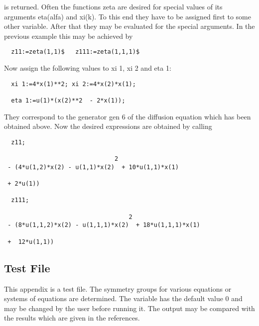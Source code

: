 is returned. Often the functions zeta are desired for special values
of its arguments eta(alfa) and xi(k). To this end they have to be
assigned first to some other variable. After that they may be
evaluated for the special arguments. In the previous example this may
be achieved by

\begin{verbatim}
  z11:=zeta(1,1)$   z111:=zeta(1,1,1)$
\end{verbatim}

Now assign the following values to xi 1, xi 2 and eta 1:

\begin{verbatim}
  xi 1:=4*x(1)**2; xi 2:=4*x(2)*x(1);

  eta 1:=u(1)*(x(2)**2  - 2*x(1));
\end{verbatim}

They correspond to the generator gen 6 of the diffusion equation which
has been obtained above. Now the desired expressions are obtained by
calling

\begin{verbatim}
  z11;

                               2
 - (4*u(1,2)*x(2) - u(1,1)*x(2)  + 10*u(1,1)*x(1)

 + 2*u(1))

  z111;

                                   2
 - (8*u(1,1,2)*x(2) - u(1,1,1)*x(2)  + 18*u(1,1,1)*x(1)

 +  12*u(1,1))
\end{verbatim}


\subsection{Test File}

This appendix is a test file. The symmetry groups for various
equations or systems of equations are determined. The variable 
has the default value 0 and may be changed by the user before running
it. The output may be compared with the results which are given in the
references.

